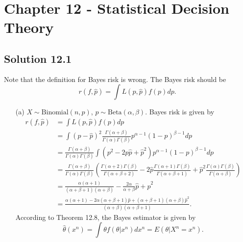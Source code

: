 \section*{Chapter 12 - Statistical Decision Theory}

\subsection*{Solution 12.1}

Note that the definition for Bayes risk is wrong.
The Bayes risk should be
\begin{equation*}
    r(f, \hat{p}) = \int L(p, \hat{p}) f(p) dp.
\end{equation*}

\begin{itemize}
\item[(a)] $X \sim \mathrm{Binomial}(n, p)$, $p \sim \mathrm{Beta}(\alpha, \beta)$.
    Bayes risk is given by
    \begin{equation*}
        \begin{split}
            r(f, \hat{p})
                &= \int L(p, \hat{p}) f(p) dp \\
                &= \int (p - \hat{p})^2 \frac{\Gamma(\alpha + \beta)}{\Gamma(\alpha) \Gamma(\beta)} p^{\alpha - 1} (1 - p)^{\beta - 1} dp \\
                &= \frac{\Gamma(\alpha + \beta)}{\Gamma(\alpha)\Gamma(\beta)} \int (p^2 - 2p\hat{p} + \hat{p}^2) p^{\alpha - 1} (1 - p)^{\beta - 1} dp \\
                &= \frac{\Gamma(\alpha + \beta)}{\Gamma(\alpha)\Gamma(\beta)} \left(\frac{\Gamma(\alpha + 2)\Gamma(\beta)}{\Gamma(\alpha + \beta + 2)} - 2\hat{p}\frac{\Gamma(\alpha + 1)\Gamma(\beta)}{\Gamma(\alpha + \beta + 1)} + \hat{p}^2\frac{\Gamma(\alpha)\Gamma(\beta)}{\Gamma(\alpha + \beta)}\right) \\
                &= \frac{\alpha(\alpha + 1)}{(\alpha + \beta + 1)(\alpha + \beta)} - \frac{2 \alpha}{\alpha + \beta} \hat{p} + \hat{p}^2 \\
                &= \frac{\alpha(\alpha + 1) - 2 \alpha (\alpha + \beta + 1) \hat{p} + (\alpha + \beta + 1)(\alpha + \beta) \hat{p}^2}{(\alpha + \beta)(\alpha + \beta + 1)}.
        \end{split}
    \end{equation*}
    According to Theorem 12.8, the Bayes estimator is given by
    \begin{equation*}
        \hat{\theta}(x^n) = \int \theta f(\theta|x^n) dx^n = E(\theta|X^n = x^n).

\end{equation*}
\end{itemize}
